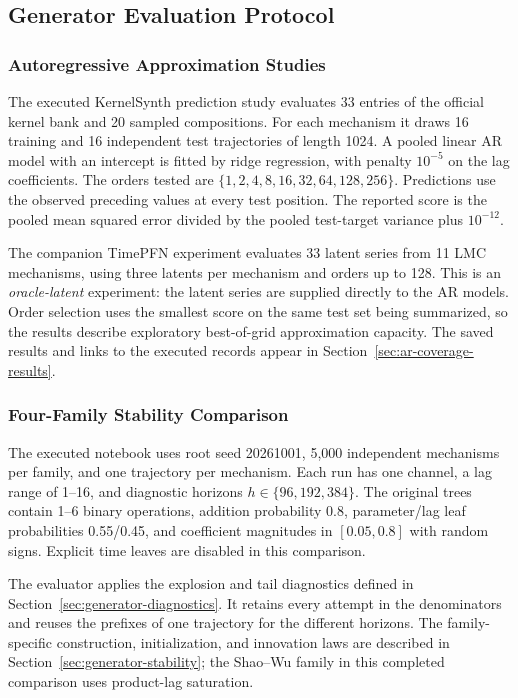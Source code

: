 \subsection{Generator Evaluation Protocol}
\label{sec:generator-evaluation-protocol}

\subsubsection{Autoregressive Approximation Studies}
\label{sec:ar-coverage-protocol}
The executed KernelSynth prediction study evaluates 33 entries of the official
kernel bank and 20 sampled compositions. For each mechanism it draws 16 training
and 16 independent test trajectories of length 1024. A pooled linear AR model
with an intercept is fitted by ridge regression, with penalty $10^{-5}$ on
the lag coefficients. The orders tested are
$\{1,2,4,8,16,32,64,128,256\}$. Predictions use the observed preceding values
at every test position. The reported score is the pooled mean squared error
divided by the pooled test-target variance plus $10^{-12}$.

The companion TimePFN experiment evaluates 33 latent series from 11 LMC
mechanisms, using three latents per mechanism and orders up to 128. This is an
\emph{oracle-latent} experiment: the latent series are supplied directly to
the AR models. Order selection uses the smallest score on the same test set
being summarized, so the results describe exploratory best-of-grid
approximation capacity. The saved results and links to the executed records
appear in Section~\ref{sec:ar-coverage-results}.

\subsubsection{Four-Family Stability Comparison}
The executed notebook
uses root seed 20261001, 5,000 independent mechanisms per family, and one
trajectory per mechanism. Each run has one channel, a lag range of 1--16,
and diagnostic horizons $h\in\{96,192,384\}$. The original trees contain
1--6 binary operations, addition probability 0.8, parameter/lag leaf
probabilities 0.55/0.45, and coefficient magnitudes in $[0.05,0.8]$ with
random signs. Explicit time leaves are disabled in this comparison.

The evaluator applies the explosion and tail diagnostics defined in
Section~\ref{sec:generator-diagnostics}. It retains every attempt in the
denominators and reuses the prefixes of one trajectory for the different
horizons. The family-specific construction, initialization, and innovation
laws are described in Section~\ref{sec:generator-stability}; the
Shao--Wu family in this completed comparison uses product-lag saturation.

